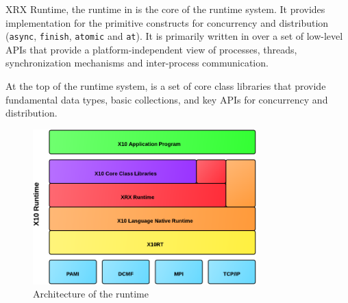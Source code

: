 XRX Runtime, the \xten runtime in \xten is the core of the \xten runtime system.
It provides implementation for the primitive \xten constructs for concurrency
and distribution (\texttt{async}, \texttt{finish}, \texttt{atomic} and
\texttt{at}). It is primarily written in \xten over a set of low-level APIs that
provide a platform-independent view of processes, threads, synchronization
mechanisms and inter-process communication. 

At the top of the \xten runtime system, is a set of core
class libraries that provide fundamental data types, basic collections, and key
APIs for concurrency and distribution.   

\begin{figure}[htbp]
    \centering
    \includegraphics[width=0.77\textwidth]{Figures/x10rt.pdf}
    \caption{Architecture of the \xten runtime}
    \label{fig:x10runtime}
\end{figure}

%
%
%   
